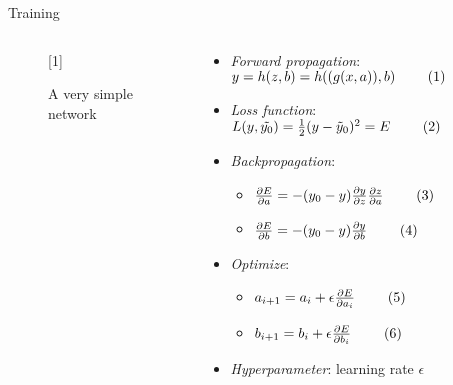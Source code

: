 \documentclass[usenames,dvipsnames,Nike,mathserif]{tuberlinbeamer}
\newcommand\inlineeqno{\stepcounter{equation}\ (\theequation)}
\begin{document}
\begin{frame}[fragile]{Training}
	\begin{columns}
		\begin{column}{.5\textwidth}
			\begin{figure}
				\scalebox{1}[1]{}
				\caption{A very simple network}
			\end{figure}
		\end{column}
	\begin{column}{.5\textwidth}
		\begin{itemize}
			\item \emph{Forward propagation}: $y=h(z,b)=h((g(x,a)),b) \qquad\inlineeqno$ 
			\item<2-> \emph{Loss function}: $L(y,\tilde{y_0})=
			\frac{1}{2}(y - \tilde{y}_0)^2 = E\qquad\inlineeqno$
			\item<3-> \emph{Backpropagation}:
			\begin{itemize}
				\item<4-> $\frac{\partial E}{\partial a} =
				-(y_0 - y)\frac{\partial y}{\partial z}\frac{\partial z}{\partial a}\qquad\inlineeqno$
				\item<4-> $\frac{\partial E}{\partial b} =
				-(y_0 - y)\frac{\partial y}{\partial b}\qquad\inlineeqno$ 
			\end{itemize} 
			\item<5-> \emph{Optimize}:
				\begin{itemize}
					\item<5->$a_{i+1}=a_i + \epsilon \frac{\partial E}{\partial a_i}\qquad\inlineeqno$
					\item<5->$b_{i+1}=b_i + \epsilon \frac{\partial E}{\partial b_i}\qquad\inlineeqno$
				\end{itemize}
			\item<6-> \emph{Hyperparameter}: learning rate $\epsilon$
		\end{itemize}
	\end{column}
	\end{columns}
\end{frame}
\end{document}
